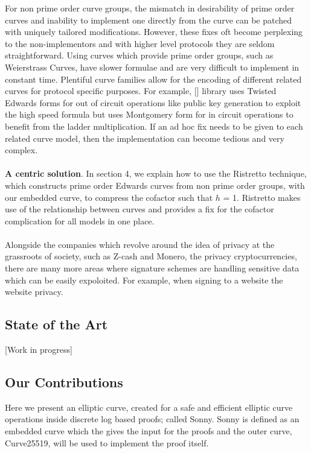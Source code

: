 \documentclass{article}
\theoremstyle{definition}
\theoremstyle{remark}
\begin{document}
	For non prime order curve groups, the mismatch in desirability of prime order curves and inability to implement one directly from the curve can be patched with uniquely tailored modifications.  However, these fixes oft become perplexing to the non-implementors and with higher level protocols they are seldom straightforward. Using curves which provide prime order groups, such as Weierstrass Curves, have slower formulae and are very difficult to implement in constant time. Plentiful curve families allow for the encoding of different related curves for protocol specific purposes. For example, [] library uses Twisted Edwards forms for out of circuit operations like public key generation to exploit the high speed formula but uses Montgomery form for in circuit operations to benefit from the ladder multiplication. If an ad hoc fix needs to be given to each related curve model, then the implementation can become tedious and very complex.\\\\
	
	{\bf A centric solution}.
	In section 4, we explain how to use the Ristretto technique, which constructs prime order Edwards curves from non prime order groups, with our embedded curve, to compress the cofactor such that $h$ = 1. Ristretto makes use of the relationship between curves and provides a fix for the cofactor complication for all models in one place.\\\\
	
	Alongside the companies which revolve around the idea of privacy at the grassroots of society, such as Z-cash and Monero, the privacy cryptocurrencies, there are many more areas where signature schemes are handling sensitive data which can be easily expoloited. For example, when signing to a website the website privacy.
	
	\subsection{State of the Art}
	
	[Work in progress]
	
	
	\subsection{Our Contributions}
	
	Here we present an elliptic curve, created for a safe and efficient elliptic curve operations inside discrete log based proofs; called Sonny. Sonny is defined as an embedded curve which the gives the input for the proofs and the outer curve, Curve25519, will be used to implement the proof itself. \\\\
	
\end{document}
